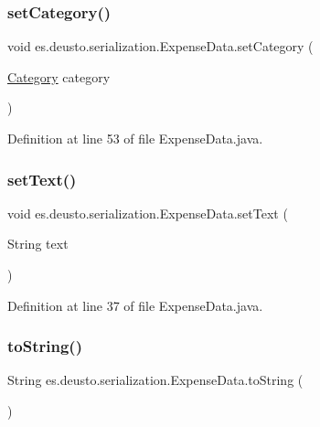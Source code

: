 \subsubsection{\texorpdfstring{set\+Category()}{setCategory()}}
{\footnotesize\ttfamily void es.\+deusto.\+serialization.\+Expense\+Data.\+set\+Category (\begin{DoxyParamCaption}\item[{\hyperlink{enumes_1_1deusto_1_1server_1_1jdo_1_1_category}{Category}}]{category }\end{DoxyParamCaption})}



Definition at line 53 of file Expense\+Data.\+java.

\mbox{\label{classes_1_1deusto_1_1serialization_1_1_expense_data_ae9cc50bc7eddb9ff751f5bb9a02eb0d4}} 
\subsubsection{\texorpdfstring{set\+Text()}{setText()}}
{\footnotesize\ttfamily void es.\+deusto.\+serialization.\+Expense\+Data.\+set\+Text (\begin{DoxyParamCaption}\item[{String}]{text }\end{DoxyParamCaption})}



Definition at line 37 of file Expense\+Data.\+java.

\mbox{\label{classes_1_1deusto_1_1serialization_1_1_expense_data_a89e0bc878ddf158ee69e56f26d0aa8e0}} 
\subsubsection{\texorpdfstring{to\+String()}{toString()}}
{\footnotesize\ttfamily String es.\+deusto.\+serialization.\+Expense\+Data.\+to\+String (\begin{DoxyParamCaption}{ }\end{DoxyParamCaption})}

